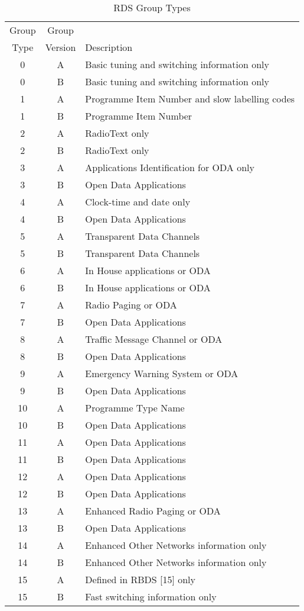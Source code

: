 \begin{table}[h]
	\begin{center}
		\begin{tabular}{ c c l }
		 Group & Group & \\
		 Type & Version & Description \\\hline
		 0 & A & Basic tuning and switching information only \\
		 0 & B & Basic tuning and switching information only \\
		 1 & A & Programme Item Number and slow labelling codes\\
		 1 & B & Programme Item Number \\
		 2 & A & RadioText only \\
		 2 & B & RadioText only \\
		 3 & A & Applications Identification for ODA only \\
		 3 & B & Open Data Applications\\
		 4 & A & Clock-time and date only \\
		 4 & B & Open Data Applications\\
		 5 & A & Transparent Data Channels \\
		 5 & B & Transparent Data Channels \\
		 6 & A & In House applications or ODA \\
		 6 & B & In House applications or ODA \\
		 7 & A & Radio Paging or ODA \\
		 7 & B & Open Data Applications\\
		 8 & A & Traffic Message Channel or ODA \\
		 8 & B & Open Data Applications\\
		 9 & A & Emergency Warning System or ODA \\
		 9 & B & Open Data Applications\\
		10 & A & Programme Type Name\\
		10 & B & Open Data Applications\\
		11 & A & Open Data Applications\\
		11 & B & Open Data Applications\\
		12 & A & Open Data Applications\\
		12 & B & Open Data Applications\\
		13 & A & Enhanced Radio Paging or ODA\\
		13 & B & Open Data Applications\\
		14 & A & Enhanced Other Networks information only \\
		14 & B & Enhanced Other Networks information only \\
		15 & A & Defined in RBDS [15] only\\
		15 & B & Fast switching information only \\\hline
		\end{tabular}
		\caption{RDS Group Types}
		\label{tab:rds_groups}
	\end{center}
\end{table}



